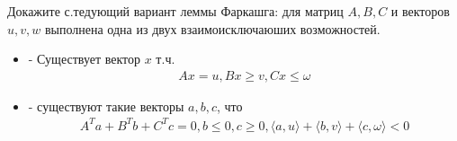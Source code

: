 \begin{prob}
    Докажите с.тедующий вариант леммы Фаркашга: для матриц $A, B, C$ и векторов $u, v, w$ выполнена одна из двух взаимоисключаюших возможностей.
    \begin{itemize}
        \item - Существует вектор $x$ т.ч.
        \begin{gather*}
            A x=u, B x \geqslant v, C x \leqslant \omega
        \end{gather*}
        \item - существуют такие векторы $a, b, c$, что
        \begin{gather*}
            A^{T} a+B^{T} b+C^{T} c=0, b \leqslant 0, c \geqslant 0,\langle a, u\rangle+\langle b, v\rangle+\langle c, \omega\rangle<0
        \end{gather*}
    \end{itemize}
\end{prob}

